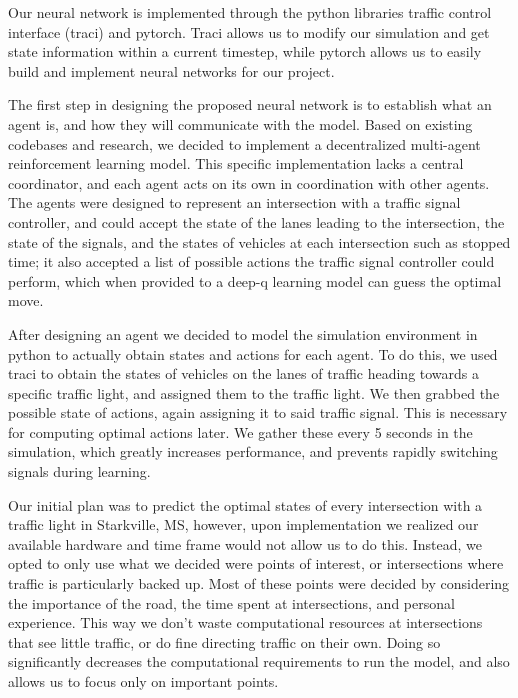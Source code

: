 \documentclass[conference]{IEEEtran}
\begin{document}
Our neural network is implemented through the python libraries traffic control interface (traci) and pytorch. Traci allows us to modify our simulation and get state information within a current timestep, while pytorch allows us to easily build and implement neural networks for our project. 

The first step in designing the proposed neural network is to establish what an agent is, and how they will communicate with the model. Based on existing codebases and research, we decided to implement a decentralized multi-agent reinforcement learning model. This specific implementation lacks a central coordinator, and each agent acts on its own in coordination with other agents. The agents were designed to represent an intersection with a traffic signal controller, and could accept the state of the lanes leading to the intersection, the state of the signals, and the states of vehicles at each intersection such as stopped time; it also accepted a list of possible actions the traffic signal controller could perform, which when provided to a deep-q learning model can guess the optimal move.  

After designing an agent we decided to model the simulation environment in python to actually obtain states and actions for each agent. To do this, we used traci to obtain the states of vehicles on the lanes of traffic heading towards a specific traffic light, and assigned them to the traffic light. We then grabbed the possible state of actions, again assigning it to said traffic signal. This is necessary for computing optimal actions later. We gather these every 5 seconds in the simulation, which greatly increases performance, and prevents rapidly switching signals during learning. 

Our initial plan was to predict the optimal states of every intersection with a traffic light in Starkville, MS, however, upon implementation we realized our available hardware and time frame would not allow us to do this. Instead, we opted to only use what we decided were points of interest, or intersections where traffic is particularly backed up. Most of these points were decided by considering the importance of the road, the time spent at intersections, and personal experience. This way we don't waste computational resources at intersections that see little traffic, or do fine directing traffic on their own. Doing so significantly decreases the computational requirements to run the model, and also allows us to focus only on important points. 
\end{document}
